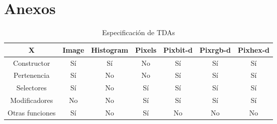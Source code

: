 \section*{Anexos}

\begin{table}[H]
    \begin{center}
    \begin{tabular}{| c | c | c | c | c | c | c | }
    \hline
    X & Image & Histogram & Pixels & Pixbit-d & Pixrgb-d & Pixhex-d \\ \hline
    Constructor & Sí & Sí & No & Sí & Sí & Sí \\
    Pertenencia & Sí & No & No & Sí & Sí & Sí \\
    Selectores & Sí & No & Sí & Sí & Sí & Sí \\
    Modificadores & No & No & Sí & Sí & Sí & Sí \\
    Otras funciones & Sí & No & Sí & No & No & No \\ \hline
    \end{tabular}
    \caption{Especificación de TDAs}
    \label{tab:TDAs}
    \end{center}
\end{table}


